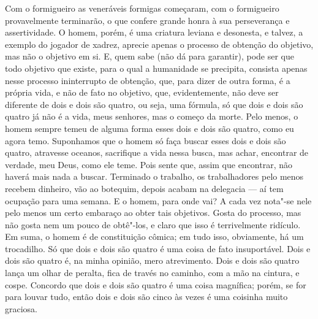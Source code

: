 Com o formigueiro as veneráveis formigas começaram, com o formigueiro
provavelmente terminarão, o que confere grande honra à sua perseverança
e assertividade. O homem, porém, é uma criatura leviana e desonesta, e
talvez, a exemplo do jogador de xadrez, aprecie apenas o processo de
obtenção do objetivo, mas não o objetivo em si. E, quem sabe (não dá
para garantir), pode ser que todo objetivo que existe, para o qual a
humanidade se precipita, consista apenas nesse processo ininterrupto de
obtenção, que, para dizer de outra forma, é a própria vida, e não de
fato no objetivo, que, evidentemente, não deve ser diferente de dois e
dois são quatro, ou seja, uma fórmula, só que dois e dois são quatro já
não é a vida, meus senhores, mas o começo da morte. Pelo menos, o homem
sempre temeu de alguma forma esses dois e dois são quatro, como eu agora
temo. Suponhamos que o homem só faça buscar esses dois e dois são
quatro, atravesse oceanos, sacrifique a vida nessa busca, mas achar,
encontrar de verdade, meu Deus, como ele teme. Pois sente que, assim que
encontrar, não haverá mais nada a buscar. Terminado o trabalho, os
trabalhadores pelo menos recebem dinheiro, vão ao botequim, depois
acabam na delegacia --- aí tem ocupação para uma semana. E o homem, para
onde vai? A cada vez nota"-se nele pelo menos um certo embaraço ao obter
tais objetivos. Gosta do processo, mas não gosta nem um pouco de
obtê"-los, e claro que isso é terrivelmente ridículo. Em suma, o homem é
de constituição cômica; em tudo isso, obviamente, há um trocadilho. Só
que dois e dois são quatro é uma coisa de fato insuportável. Dois e dois
são quatro é, na minha opinião, mero atrevimento. Dois e dois são quatro
lança um olhar de peralta, fica de través no caminho, com a mão na
cintura, e cospe. Concordo que dois e dois são quatro é uma coisa
magnífica; porém, se for para louvar tudo, então dois e dois são cinco
às vezes é uma coisinha muito graciosa.

